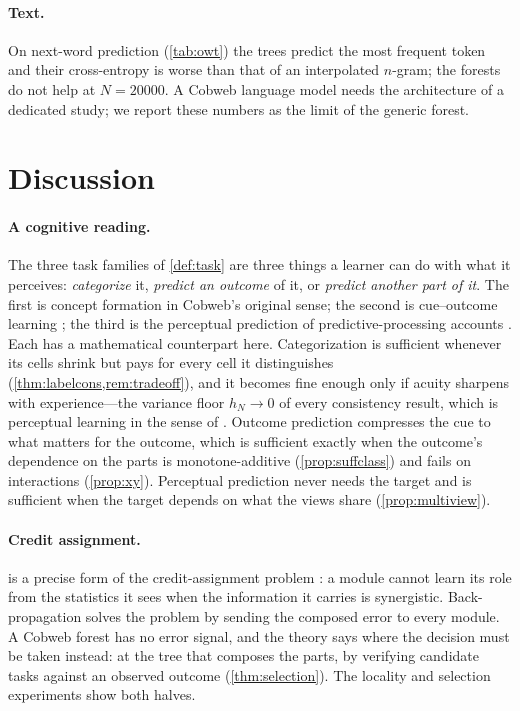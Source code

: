 \documentclass[11pt]{article}
\theoremstyle{definition}
\theoremstyle{remark}
\begin{document}
\paragraph{Text.}
On next-word prediction (\cref{tab:owt}) the trees predict the most frequent token and
their cross-entropy is worse than that of an interpolated $n$-gram; the forests do not
help at $N=20000$.  A Cobweb language model needs the architecture of a dedicated study;
we report these numbers as the limit of the generic forest.

\section{Discussion}\label{sec:discussion}

\paragraph{A cognitive reading.}
The three task families of \cref{def:task} are three things a learner can do with what it
perceives: \emph{categorize} it, \emph{predict an outcome} of it, or \emph{predict
another part of it}.  The first is concept formation in Cobweb's original sense; the
second is cue--outcome learning \citep{rescorla1972}; the third is the perceptual
prediction of predictive-processing accounts \citep{clark2013}.  Each has a mathematical
counterpart here.  Categorization is sufficient whenever its cells shrink but pays for every cell it
distinguishes (\cref{thm:labelcons,rem:tradeoff}), and it becomes fine enough only if
acuity sharpens with experience---the variance floor $h_N\to0$ of every consistency result,
which is perceptual learning in the sense of \citet{goldstone1998}.  Outcome prediction
compresses the cue to what matters for the outcome, which is sufficient exactly when the
outcome's dependence on the parts is monotone-additive (\cref{prop:suffclass}) and fails
on interactions (\cref{prop:xy}).  Perceptual prediction never needs the target and is
sufficient when the target depends on what the views share (\cref{prop:multiview}).

\paragraph{Credit assignment.}
 is a precise form of the credit-assignment problem
\citep{minsky1961}: a module cannot learn its role from the statistics it sees when the
information it carries is synergistic.  Back-propagation solves the problem by sending
the composed error to every module.  A Cobweb forest has no error signal, and the theory
says where the decision must be taken instead: at the tree that composes the parts, by
verifying candidate tasks against an observed outcome (\cref{thm:selection}).  The
locality and selection experiments show both halves.
\end{document}
